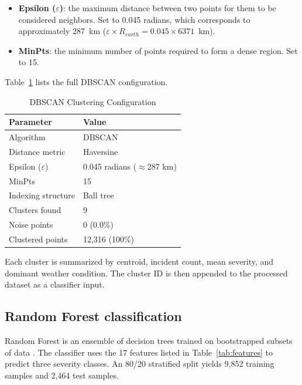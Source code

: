 \documentclass[conference]{IEEEtran}
\begin{document}
\begin{itemize}
\item \textbf{Epsilon ($\varepsilon$)}: the maximum distance between two points for them to be considered neighbors. Set to 0.045 radians, which corresponds to approximately 287~km ($\varepsilon \times R_{earth} = 0.045 \times 6371$~km).
\item \textbf{MinPts}: the minimum number of points required to form a dense region. Set to 15.
\end{itemize}

Table~\ref{tab:dbscan_params} lists the full DBSCAN configuration.

\begin{table}[htbp]
\caption{DBSCAN Clustering Configuration}
\begin{center}
\begin{tabular}{ll}
\toprule
\textbf{Parameter} & \textbf{Value} \\
\midrule
Algorithm & DBSCAN \\
Distance metric & Haversine \\
Epsilon ($\varepsilon$) & 0.045 radians ($\approx$287 km) \\
MinPts & 15 \\
Indexing structure & Ball tree \\
Clusters found & 9 \\
Noise points & 0 (0.0\%) \\
Clustered points & 12,316 (100\%) \\
\bottomrule
\end{tabular}
\label{tab:dbscan_params}
\end{center}
\end{table}

Each cluster is summarized by centroid, incident count, mean severity, and dominant weather condition. The cluster ID is then appended to the processed dataset as a classifier input.

\subsection{Random Forest classification}

Random Forest is an ensemble of decision trees trained on bootstrapped subsets of data \cite{b21}. The classifier uses the 17 features listed in Table~\ref{tab:features} to predict three severity classes. An 80/20 stratified split yields 9,852 training samples and 2,464 test samples.
\end{document}
